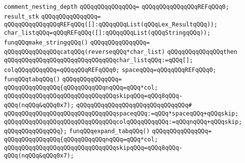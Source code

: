 \newline
\verb|comment_nesting_depth|\newline
\verb|qQQqqQQqqQQqqQQq=|\newline
\verb|qQQqqQQqqQQqqQQqREFqQQq0;|\newline
\newline
\verb|result_stk|\newline
\verb|qQQqqQQqqQQqqQQq=|\newline
\verb|qQQqqQQqqQQqqQQqREFqQQq([]:qQQqqQQqList(qQQqLex_ResultqQQq));|\newline
\newline
\verb|char_listqQQq=qQQqREFqQQq([]:qQQqqQQqList(qQQqStringqQQq));|\newline
\newline
\verb|funqQQqmake_stringqQQq()|\newline
\verb|qQQqqQQqqQQqqQQq=|\newline
\verb|qQQqqQQqqQQqqQQqcatqQQq(reverseqQQq*char_list)|\newline
\verb|qQQqqQQqqQQqqQQqthen|\newline
\verb|qQQqqQQqqQQqqQQqqQQqqQQqqQQqqQQqchar_listqQQq:=qQQq[];|\newline
\newline
\verb|colqQQqqQQqqQQq=qQQqqQQqREFqQQq0;|\newline
\verb|spaceqQQq=qQQqqQQqREFqQQq0;|\newline
\newline
\verb|funqQQqtabqQQq()|\newline
\verb|qQQqqQQqqQQqqQQq=|\newline
\verb|qQQqqQQqqQQqqQQq{qQQqqQQqqQQqnqQQq=qQQq*col;|\newline
\verb|qQQqqQQqqQQqqQQqqQQqqQQqqQQqqQQqskipqQQq=qQQq8qQQq-qQQq(nqQQq&qQQq0x7);|\newline
\verb|qQQqqQQqqQQqqQQqqQQqqQQqqQQqqQQq#|\newline
\verb|qQQqqQQqqQQqqQQqqQQqqQQqqQQqqQQqspaceqQQq:=qQQq*spaceqQQq+qQQqskip;|\newline
\verb|qQQqqQQqqQQqqQQqqQQqqQQqqQQqqQQqcolqQQqqQQqqQQq:=qQQqnqQQq+qQQqskip;|\newline
\verb|qQQqqQQqqQQqqQQq};|\newline
\newline
\verb|funqQQqexpand_tabqQQq()|\newline
\verb|qQQqqQQqqQQqqQQq=|\newline
\verb|qQQqqQQqqQQqqQQq{qQQqqQQqqQQqnqQQq=qQQq*col;|\newline
\verb|qQQqqQQqqQQqqQQqqQQqqQQqqQQqqQQqskipqQQq=qQQq8qQQq-qQQq(nqQQq&qQQq0x7);|\newline
